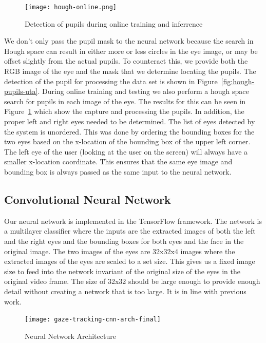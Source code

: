 \documentclass[10pt,twocolumn,letterpaper]{article}
\begin{document}
\begin{figure}[!h]
  \begin{center}
    \texttt{[image: hough-online.png]}
    \caption{Detection of pupils during online training and
      inferrence}
    \label{fig:hough-online}
  \end{center}
\end{figure}

We don't only pass the pupil mask
to the neural network because the search in Hough space can result in
either more or less circles in the eye image, or may be offset
slightly from the actual pupils. To counteract this, we provide both
the RGB image of the eye and the mask that we determine locating the
pupils. The detection of the pupil for processing the data set is shown in
Figure~\ref{fig:hough-pupils-uta}. During online training and testing
we also perform a hough space search for pupils in each image of the
eye. The results for this can be seen in Figure~\ref{fig:hough-online}
which show the capture and processing the pupils. In addition, the
proper left and right eyes needed to be determined. The list of eyes
detected by the system is unordered. This was done by
ordering the bounding boxes for the two eyes based on the x-location
of the bounding box of the upper left corner. The left eye of the user
(looking at the user on the screen) will always have a smaller
x-location coordinate. This ensures that the same eye image and
bounding box is always passed as the same input to the neural network.

\subsection{Convolutional Neural Network}
Our neural network is implemented in the TensorFlow framework. The
network is a multilayer classifier where the inputs are the extracted
images of both the left and the right eyes and the bounding boxes for
both eyes and the face in the original image. The two images of the
eyes are 32x32x4 images where the extracted images of the eyes are
scaled to a set size. This gives us a fixed image size to feed into
the network invariant of the original size of the eyes in the original
video frame. The size of 32x32 should be large enough to provide
enough detail without creating a network that is too large. It is in
line with previous work. 

\begin{figure}
  \begin{center}
    \texttt{[image: gaze-tracking-cnn-arch-final]}
  \end{center}
  \caption{Neural Network Architecture}
  \label{fig.cnn-arch}
\end{figure}
\end{document}
